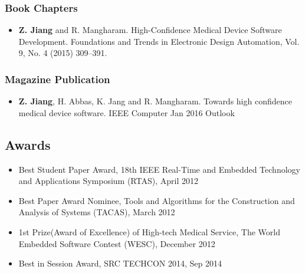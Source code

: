 \documentclass[a4paper,11pt]{article}
\begin{document}
\subsubsection{Book Chapters}
\begin{itemize}
\item \textbf{Z. Jiang} and R. Mangharam. High-Confidence Medical Device Software
Development. Foundations and Trends in Electronic Design Automation, Vol. 9, No. 4 (2015) 309–391.
\end{itemize}
\subsubsection{Magazine Publication}
\begin{itemize}
\item \textbf{Z. Jiang}, H. Abbas, K. Jang and R. Mangharam. Towards high confidence medical device software. IEEE Computer Jan 2016 Outlook
\end{itemize}
\subsection{Awards}

\begin{itemize}
	\item Best Student Paper Award, 18th IEEE Real-Time and Embedded Technology and Applications Symposium (RTAS), April 2012
	\item Best Paper Award Nominee, Tools and Algorithms for the Construction and Analysis of Systems (TACAS), March 2012
	\item 1st Prize(Award of Excellence) of High-tech Medical Service, The World Embedded Software Contest (WESC), December 2012
	\item Best in Session Award, SRC TECHCON 2014, Sep 2014
\end{itemize}
\end{document}
